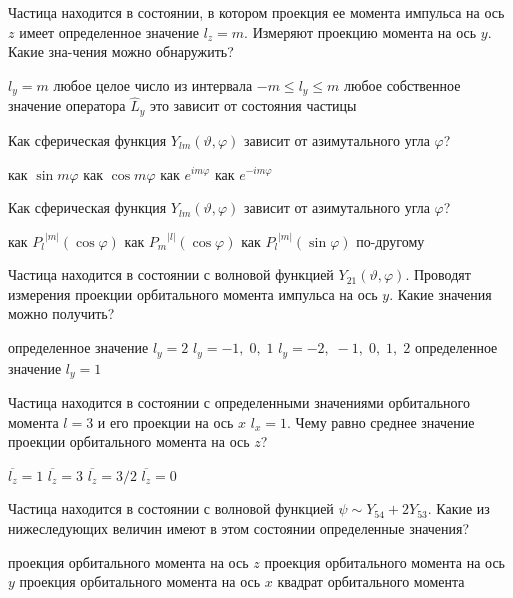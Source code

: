 \documentclass[11pt,a4paper]{exam}
\begin{document}
\begin{questions}
\question Частица находится в состоянии, в котором проекция ее момента импульса на ось $z$ имеет определенное значение ${l_z} = m$. Измеряют проекцию момента на ось $y$. Какие зна-чения можно обнаружить?
\begin{choices}
\choice ${l_y} = m$
\choice любое целое число из интервала $ - m \le {l_y} \le m$
\choice любое собственное значение оператора ${\hat L_y}$
\choice это зависит от состояния частицы
\end{choices}

\question Как сферическая функция ${Y_{lm}}(\vartheta ,\varphi )$ зависит от азимутального угла $\varphi $?
\begin{choices}
\choice как $\sin m\varphi $       
\choice как $\cos m\varphi $       
\choice как ${e^{im\varphi }}$     
\choice как ${e^{ - im\varphi }}$
\end{choices}

\question Как сферическая функция ${Y_{lm}}(\vartheta ,\varphi )$ зависит от азимутального угла $\varphi $?
\begin{choices}
\choice как ${P_l}^{|m|}(\cos \varphi )$       
\choice как ${P_m}^{|l|}(\cos \varphi )$
\choice как ${P_l}^{|m|}(\sin \varphi )$       
\choice по-другому
\end{choices}

\question Частица находится в состоянии с волновой функцией ${Y_{21}}(\vartheta ,\varphi )$. Проводят измерения проекции орбитального момента импульса на ось $y$. Какие значения можно получить?
\begin{choices}
\choice определенное значение ${l_y} = 2$      
\choice ${l_y} =  - 1,\;0,\;1$
\choice ${l_y} =  - 2,\; - 1,\;0,\;1,\;2$            
\choice определенное значение ${l_y} = 1$
\end{choices}

\question Частица находится в состоянии с определенными значениями орбитального момента $l = 3$ и его проекции на ось $x$ ${l_x} = 1$. Чему равно среднее значение проекции орбитального момента на ось $z$?
\begin{choices}
\choice $\overline {{l_z}}  = 1$      
\choice $\overline {{l_z}}  = 3$      
\choice $\overline {{l_z}}  = 3/2$    
\choice $\overline {{l_z}}  = 0$
\end{choices}

\question Частица находится в состоянии с волновой функцией $\psi  \sim {Y_{54}} + 2{Y_{53}}$. Какие из нижеследующих величин имеют в этом состоянии определенные значения?
\begin{choices}
\choice проекция орбитального момента на ось $z$
\choice проекция орбитального момента на ось $y$
\choice проекция орбитального момента на ось $x$
\choice квадрат орбитального момента 
\end{choices}


\end{questions}
\end{document}
